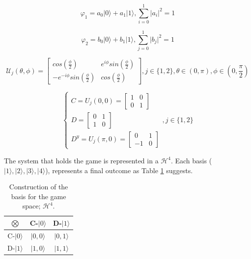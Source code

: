 \begin{equation}
\varphi_{1}=a_{0}\vert0\rangle+a_{1}\vert1\rangle,\sum_{i=0}^{1}\vert a_{i}\vert^{2}=1
\label{eq:quantum_prisioner_m1}
\end{equation}


\begin{equation}
\varphi_{2}=b_{0}\vert0\rangle+b_{1}\vert1\rangle,\sum_{j=0}^{1}\vert b_{j}\vert^{2}=1
\label{eq:quantum_prisioner_m2}
\end{equation}

\begin{equation}
\mathcal{U}_{j} ( \theta,\phi) = \left[\begin{array}{cc}
cos(\frac{\phi}{2}) & e^{i\phi}sin(\frac{\phi}{2})\\
-e^{-i\phi}sin(\frac{\phi}{2}) & cos(\frac{\phi}{2})
\end{array}\right] , j \in \{ 1, 2\}, \theta \in ( 0, \pi ) , \phi \in ( 0, \frac{\pi}{2})
\label{eq:operators_prisioneiros_quanticos}
\end{equation}

\begin{equation}
\begin{cases}C= 
U_{j}(0, 0)=\left[\begin{array}{cc}
1 & 0\\
0 & 1
\end{array}\right]\\
D=\left[\begin{array}{cc}
0 & 1\\
1 & 0
\end{array}\right] \\
D^{y}= U_{j}(\pi, 0)=\left[\begin{array}{cc}
0 & 1\\
-1 & 0
\end{array}\right]
\end{cases} , j \in \{ 1, 2 \}
\label{eq:operators_prisioneiros_quanticosmiaurons}
\end{equation}

The system that holds the game is represented in a $\mathcal{H}^{4}$. Each basis ($\vert 1\rangle, \vert 2\rangle, \vert 3\rangle, \vert 4\rangle$), represents a final outcome as Table \ref{tab:prisioners_m} suggests.

\begin{table}
\begin{centering}
\begin{tabular}{ccc}
\hline 
$\bigotimes$ & C-$\vert 0\rangle$ & D-$\vert 1\rangle$\tabularnewline
\hline 
C-$\vert 0\rangle$ & $\vert 0,0\rangle$ & $\vert 0,1\rangle$\tabularnewline
D-$\vert 1\rangle$ & $\vert 1,0\rangle$ & $\vert 1,1\rangle$\tabularnewline
\hline 
\end{tabular}
\par\end{centering}

\caption{Construction of the basis for the game space; $\mathcal{H}^{4}$.}
\label{tab:prisioners_m}
\end{table}



